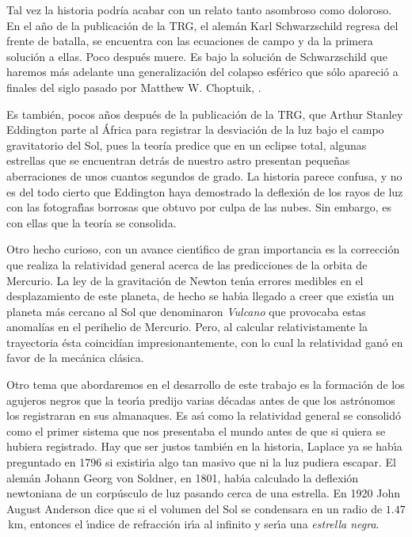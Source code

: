 \documentclass[12pt]{article}
\begin{document}
Tal vez la historia podría acabar con un relato tanto asombroso como doloroso. En el año de la publicación de la TRG, el alemán Karl Schwarzschild regresa del frente de batalla, se encuentra con las ecuaciones de campo y da la primera soluci\'on a ellas. Poco despu\'es muere. Es bajo la solución de Schwarzschild que haremos más adelante una generalización del colapso esférico que sólo apareció a finales del siglo pasado por Matthew W. Choptuik, \cite{Cho93}.

Es también, pocos años después de la publicaci\'on de la TRG, que Arthur Stanley Eddington parte al \'Africa para registrar la desviación de la luz bajo el campo gravitatorio del Sol, pues la teoría predice que en un eclipse total, algunas estrellas que se encuentran detrás de nuestro astro presentan pequeñas aberraciones de unos cuantos segundos de grado. La historia parece confusa, y no es del todo cierto que Eddington haya demostrado la deflexión de los rayos de luz con las fotograf\'{\i}as borrosas que obtuvo por culpa de las nubes. Sin embargo, es con ellas que la teoría se consolida.

Otro hecho curioso, con un avance cient\'{\i}fico de gran importancia es la correcci\'on que realiza la relatividad general acerca de las predicciones de la orbita de Mercurio. La ley de la gravitaci\'on de Newton ten\'{\i}a errores medibles en el desplazamiento de este planeta, de hecho se hab\'{\i}a llegado a creer que exist\'{\i}a un planeta m\'as cercano al Sol que denominaron {\it Vulcano} que provocaba estas anomalías en el perihelio de Mercurio. Pero, al calcular relativistamente la trayectoria \'esta coincidían impresionantemente, con lo cual la relatividad gan\'o en favor de la mec\'anica cl\'asica.

Otro tema que abordaremos en el desarrollo de este trabajo es la formaci\'on de los agujeros negros que la teor\'{\i}a predijo varias d\'ecadas antes de que los astr\'onomos los registraran en sus almanaques. Es as\'{\i} como la relatividad general se consolid\'o como el primer sistema que nos presentaba el mundo antes de que si quiera se hubiera registrado.
Hay que ser justos tambi\'en en la historia, Laplace ya se hab\'{\i}a preguntado en 1796 si existir\'{\i}a algo tan masivo que ni la luz pudiera escapar. El alem\'an Johann Georg von Soldner, en 1801, hab\'{\i}a calculado la deflexi\'on newtoniana de un corp\'usculo de luz pasando cerca de una estrella. En 1920 John August Anderson dice que si el volumen del Sol se condensara en un radio de $1.47$\,km, entonces el \'{\i}ndice de refracci\'on ir\'{\i}a al infinito y ser\'{\i}a una {\it estrella negra}.
\end{document}
